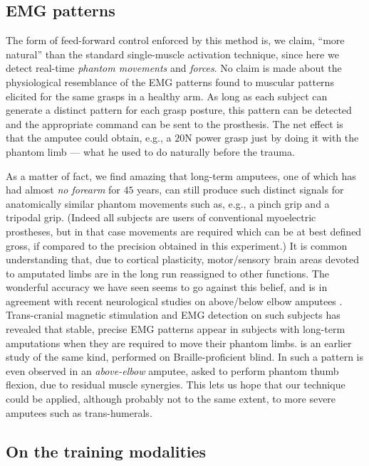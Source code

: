 \documentclass[review,authoryear]{elsarticle}
\renewcommand{\cite}{\citep}
\begin{document}
\subsection{EMG patterns}

The form of feed-forward control enforced by this method is, we claim, ``more
natural'' than the standard single-muscle activation technique, since here
we detect real-time \emph{phantom movements} and \emph{forces}.
No claim is made about the physiological resemblance of the EMG patterns found
to muscular patterns elicited for the same grasps in a healthy arm. As long as
each subject can generate a distinct pattern for each grasp posture, this pattern
can be detected and the appropriate command can be sent to the prosthesis.
The net effect is that the amputee could obtain, e.g., a $20$N power grasp just
by doing it with the phantom limb --- what he used to do naturally before the trauma.

As a matter of fact, we find amazing that long-term amputees, one of which has
had almost \emph{no forearm} for $45$ years, can still produce such distinct signals
for anatomically similar phantom movements such as, e.g., a pinch grip and a
tripodal grip. (Indeed all subjects are users of conventional myoelectric
prostheses, but in that case movements are required which can be at
best defined gross, if compared to the precision obtained in this experiment.)
It is common understanding that, due to cortical plasticity, motor/sensory brain
areas devoted to amputated limbs are in the long run reassigned to other
functions. The wonderful accuracy we have seen seems to go against this belief,
and is in agreement with recent neurological studies on above/below elbow
amputees \cite{sirigu1,sirigu2}. Trans-cranial magnetic stimulation and EMG detection
on such subjects has revealed that stable, precise EMG patterns appear in subjects with long-term
amputations when they are required to move their phantom limbs. \cite{pascual} is
an earlier study of the same kind, performed on Braille-proficient blind.
In \cite{sirigu2} such a pattern is even observed in an \emph{above-elbow} amputee, asked to perform
phantom thumb flexion, due to residual muscle synergies. This lets us hope that
our technique could be applied, although probably not to the same extent, to more
severe amputees such as trans-humerals.

\subsection{On the training modalities}
\end{document}
